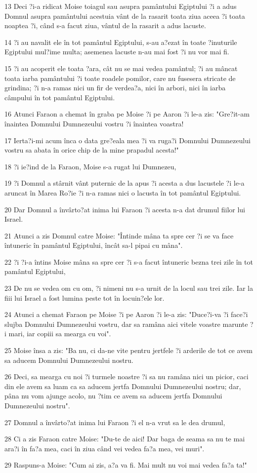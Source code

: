 \par 13 Deci ?i-a ridicat Moise toiagul sau asupra pamântului Egiptului ?i a adus Domnul asupra pamântului acestuia vânt de la rasarit toata ziua aceea ?i toata noaptea ?i, când s-a facut ziua, vântul de la rasarit a adus lacuste.
\par 14 ?i au navalit ele în tot pamântul Egiptului, s-au a?ezat în toate ?inuturile Egiptului mul?ime multa; asemenea lacuste n-au mai fost ?i nu vor mai fi.
\par 15 ?i au acoperit ele toata ?ara, cât nu se mai vedea pamântul; ?i au mâncat toata iarba pamântului ?i toate roadele pomilor, care nu fusesera stricate de grindina; ?i n-a ramas nici un fir de verdea?a, nici în arbori, nici în iarba câmpului în tot pamântul Egiptului.
\par 16 Atunci Faraon a chemat în graba pe Moise ?i pe Aaron ?i le-a zis: "Gre?it-am înaintea Domnului Dumnezeului vostru ?i înaintea voastra!
\par 17 Ierta?i-mi acum înca o data gre?eala mea ?i va ruga?i Domnului Dumnezeului vostru sa abata în orice chip de la mine prapadul acesta!"
\par 18 ?i ie?ind de la Faraon, Moise s-a rugat lui Dumnezeu,
\par 19 ?i Domnul a stârnit vânt puternic de la apus ?i acesta a dus lacustele ?i le-a aruncat în Marea Ro?ie ?i n-a ramas nici o lacusta în tot pamântul Egiptului.
\par 20 Dar Domnul a învârto?at inima lui Faraon ?i acesta n-a dat drumul fiilor lui Israel.
\par 21 Atunci a zis Domnul catre Moise: "Întinde mâna ta spre cer ?i se va face întuneric în pamântul Egiptului, încât sa-l pipai cu mâna".
\par 22 ?i ?i-a întins Moise mâna sa spre cer ?i s-a facut întuneric bezna trei zile în tot pamântul Egiptului,
\par 23 De nu se vedea om cu om, ?i nimeni nu s-a urnit de la locul sau trei zile. Iar la fiii lui Israel a fost lumina peste tot în locuin?ele lor.
\par 24 Atunci a chemat Faraon pe Moise ?i pe Aaron ?i le-a zis: "Duce?i-va ?i face?i slujba Domnului Dumnezeului vostru, dar sa ramâna aici vitele voastre marunte ?i mari, iar copiii sa mearga cu voi".
\par 25 Moise însa a zis: "Ba nu, ci da-ne vite pentru jertfele ?i arderile de tot ce avem sa aducem Domnului Dumnezeului nostru.
\par 26 Deci, sa mearga cu noi ?i turmele noastre ?i sa nu ramâna nici un picior, caci din ele avem sa luam ca sa aducem jertfa Domnului Dumnezeului nostru; dar, pâna nu vom ajunge acolo, nu ?tim ce avem sa aducem jertfa Domnului Dumnezeului nostru".
\par 27 Domnul a învârto?at inima lui Faraon ?i el n-a vrut sa le dea drumul,
\par 28 Ci a zis Faraon catre Moise: "Du-te de aici! Dar baga de seama sa nu te mai ara?i în fa?a mea, caci în ziua când vei vedea fa?a mea, vei muri".
\par 29 Raspuns-a Moise: "Cum ai zis, a?a va fi. Mai mult nu voi mai vedea fa?a ta!"

